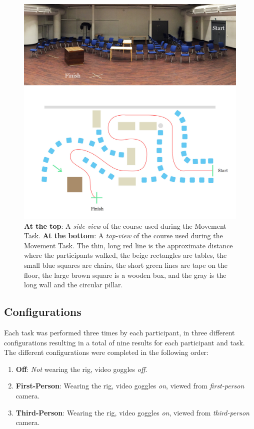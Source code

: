 \documentclass[runningheads,a4paper,oribibl]{llncs}
\begin{document}

\begin{figure}
   \centering
   \includegraphics[width=\textwidth]{ExternalMaterial/Course-top-side}
   \caption{\textbf{At the top}: A \emph{side-view} of the course used during the Movement Task. \textbf{At the bottom}: A \emph{top-view} of the course used during the Movement Task. The thin, long red line is the approximate distance where the participants walked, the beige rectangles are tables, the small blue squares are chairs, the short green lines are tape on the floor, the large brown square is a wooden box, and the gray is the long wall and the circular pillar.} \label{fig:CourseTopSide}
\end{figure}








\subsection{Configurations} \label{subsubsec:Configurations}
Each task was performed three times by each participant, in three different configurations resulting in a total of nine results for each participant and task. The different configurations were completed in the following order:
\begin{enumerate}
	\item \textbf{Off}: \emph{Not} wearing the rig, video goggles \emph{off}.
	\item \textbf{First-Person}: Wearing the rig, video goggles \emph{on}, viewed from \emph{first-person} camera.
	\item \textbf{Third-Person}: Wearing the rig, video goggles \emph{on}, viewed from \emph{third-person} camera.
\end{enumerate} 
\end{document}
